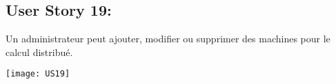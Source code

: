 \newpage{}
\subsection{User Story 19:}
Un administrateur peut ajouter, modifier ou supprimer des machines pour le calcul distribué.


  \begin{center}
        \texttt{[image: US19]}
  \end{center}